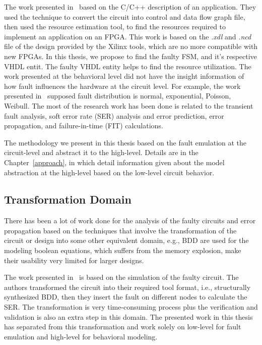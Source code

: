 The work presented in~\citep{thibeault2013library} based on the C/C++ description of an application. They used the technique to convert the circuit into control and data flow graph  file, then used the resource estimation tool, to find the resources required to implement an application on an FPGA. This work is based on the \textit{.xdl} and \textit{.ncd} file of the design provided by the Xilinx tools, which are no more compatible with new FPGAs. In this thesis, we propose to find the faulty FSM, and it's respective VHDL entit. The faulty VHDL entity helps to find the resource utilization. 
The work presented at the behavioral level did not have the insight information of how fault influences the hardware at the circuit level. For example, the work presented in~\citep{janschek2017errorsim} supposed fault distribution is normal, exponential, Poisson, Weibull. The most of the research work has been done is related to the transient fault analysis, soft error rate (SER) analysis and error prediction, error propagation, and failure-in-time (FIT) calculations.

The methodology we present in this thesis based on the fault emulation at the circuit-level and abstract it to the high-level. Details are in the Chapter~\ref{approach}, in which detail information given about the model abstraction at the high-level based on the low-level circuit behavior.
\subsection{Transformation Domain}
There has been a lot of work done for the analysis of the faulty circuits and error propagation based on the techniques that involve the transformation of the circuit or design into some other equivalent domain, e.g., BDD are used for the modeling boolean equations, which suffers from the memory explosion, make their usability very limited for larger designs.

The work presented in~\citep{ubar2014modeling} is based on the simulation of the faulty circuit.  The authors transformed the circuit into their required tool format, i.e., structurally synthesized BDD, then they
insert the fault on different nodes to calculate the SER.  The transformation is very time-consuming process plus the verification and validation is also an extra step in this domain. The presented work in this thesis has separated from this transformation and work solely on low-level for fault emulation and high-level for behavioral modeling.

